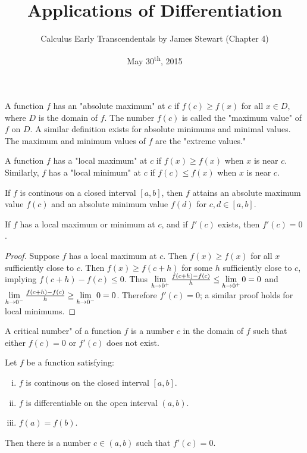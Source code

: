 \documentclass[a4paper,8pt]{article}
\title{Applications of Differentiation}
\author{Calculus Early Transcendentals by James Stewart (Chapter 4)}
\date{May 30\textsuperscript{th}, 2015}
\begin{document}
\maketitle
{}

\begin{outline}

    A function \(f\) has an "absolute maximum" at \(c\) if \(f(c) \geq f(x)\) for all \(x \in D\), where \(D\) is the
    domain of \(f\). The number \(f(c)\) is called the "maximum value" of \(f\) on \(D\). A similar definition exists
    for absolute minimums and minimal values. The maximum and minimum values of \(f\) are the "extreme values."

    A function \(f\) has a "local maximum" at \(c\) if \(f(x) \geq f(x)\) when \(x\) is near \(c\). Similarly, \(f\)
    has a "local minimum" at \(c\) if \(f(c) \leq f(x)\) when \(x\) is near \(c\).

    If \(f\) is continous on a closed interval \([a, b]\), then \(f\) attains an absolute maximum value \(f(c)\) and
    an absolute minimum value \(f(d)\) for \(c,d \in [a, b]\).

    If \(f\) has a local maximum or minimum at \(c\), and if \(f'(c)\) exists, then \(f'(c) = 0\).

    \begin{proof}
      Suppose \(f\) has a local maximum at \(c\). Then \(f(x) \geq f(x)\) for all \(x\) sufficiently close to \(c\).
      Then \(f(x)\geq f(c+h)\) for some \(h\) sufficiently close to \(c\), implying \(f(c+h)-f(c)\leq 0\). Thus
      \(\xlimit[+]{h}{0} \frac{f(c+h)-f(c)}{h} \leq \xlimit[+]{h}{0} 0 = 0\) and \(\xlimit[-]{h}{0} \frac{f(c+h)-f(c)}
      {h} \geq \xlimit[-]{h}{0} 0 = 0\). Therefore \(f'(c)=0\); a similar proof holds for local minimums.
    \end{proof}

    A critical number" of a function \(f\) is a number \(c\) in the domain of \(f\) such that either \(f(c)=0\)
    or \(f'(c)\) does not exist.

    Let \(f\) be a function satisfying:
    \begin{enumerate}[i.]
      \item \(f\) is continous on the closed interval \([a, b]\).
      \item \(f\) is differentiable on the open interval \((a, b)\).
      \item \(f(a) = f(b)\).
    \end{enumerate}
    Then there is a number \(c \in (a, b)\) such that \(f'(c) = 0\).


\end{outline}
\end{document}
